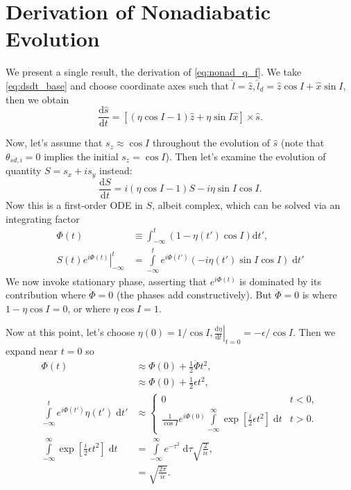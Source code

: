 \documentclass[
        fleqn,
        usenatbib,
        referee,
    ]{mnras}
\newcommand*{\rd}[2]{\frac{\mathrm{d}#1}{\mathrm{d}#2}}
\newcommand*{\at}[1]{\left.#1\right|}
\newcommand*{\p}[1]{\left(#1\right)}
\newcommand*{\s}[1]{\left[#1\right]}
\begin{document}
\section{Derivation of Nonadiabatic Evolution}\label{s:nonad_app}

We present a single result, the derivation of \autoref{eq:nonad_q_f}. We take
\autoref{eq:dsdt_base} and choose coordinate axes such that $\hat{l} = \hat{z},
\hat{l}_d = \hat{z} \cos I + \hat{x}\sin I$, then we obtain
\begin{equation}
    \rd{\hat{s}}{t} = \s{
        \p{\eta \cos I - 1}\hat{z} + \eta \sin I \hat{x}} \times \hat{s}.
\end{equation}

Now, let's assume that $s_z \approx \cos I$ throughout the evolution of $\hat{s}$
(note that $\theta_{sd, i} = 0$ implies the initial $s_z = \cos I$). Then let's
examine the evolution of quantity $S = s_x + is_y$ instead:
\begin{equation}
    \rd{S}{t} = i\p{\eta\cos I - 1}S - i \eta \sin I\cos I.\label{eq:nonad_ode}
\end{equation}
Now this is a first-order ODE in $S$, albeit complex, which can be solved via
an integrating factor
\begin{align}
    \Phi(t) &\equiv \int_{-\infty}^t \p{1 - \eta(t') \cos I}
        \mathrm{d}t',\\
    \at{S(t) e^{i\Phi(t)}}_{-\infty}^t
        &= \int\limits_{-\infty}^t e^{i\Phi(t')}
            \p{-i\eta(t')\sin I\cos I}\;\mathrm{d}t'\label{eq:nonad_int}
\end{align}
We now invoke stationary phase, asserting that $e^{i\Phi(t)}$ is dominated by
its contribution where $\dot{\Phi} = 0$ (the phases add constructively). But
$\dot{\Phi} = 0$ is where $1 - \eta\cos I = 0$, or where $\eta\cos I = 1$.

Now at this point, let's choose $\eta(0) = 1/\cos I, \at{\rd{\eta}{t}}_{t=0} =
-\epsilon/\cos I$. Then we expand near $t = 0$ so
\begin{align*}
    \Phi(t) &\approx \Phi(0) + \frac{1}{2}\ddot{\Phi}t^2,\\
        &\approx \Phi(0) + \frac{1}{2}\epsilon t^2,\\
    \int\limits_{-\infty}^t e^{i\Phi(t')}\eta(t')\;\mathrm{d}t'
        &\approx
        \begin{cases}
            0 & t < 0,\\
            \frac{1}{\cos I}e^{i\Phi(0)}\int\limits_{-\infty}^\infty
                \exp\s{\frac{i}{2}\epsilon t^2}\;\mathrm{d}t
                & t > 0.
        \end{cases}\\
    \int\limits_{-\infty}^\infty
                \exp\s{\frac{i}{2}\epsilon t^2}\;\mathrm{d}t
        &= \int\limits_{-\infty}^\infty e^{-\tau^2}\;\mathrm{d}\tau
            \sqrt{\frac{2}{i\epsilon}},\\
        &= \sqrt{\frac{2\pi}{i\epsilon}}.
\end{align*}
\end{document}
